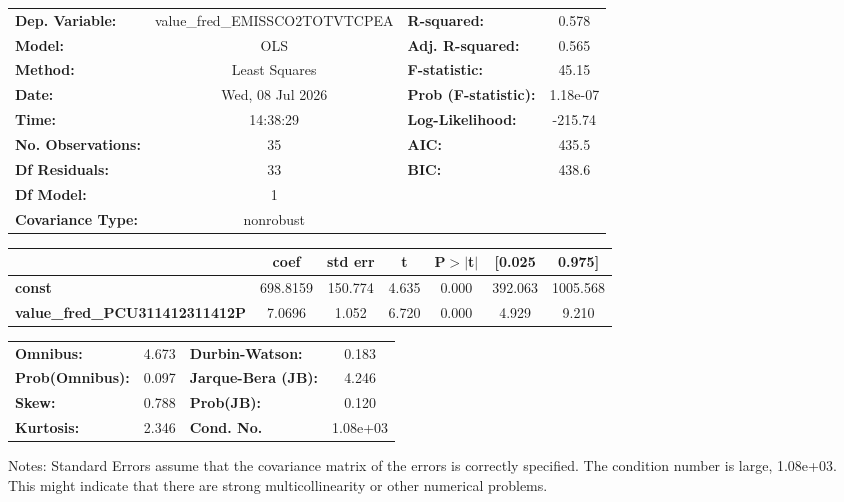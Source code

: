 \begin{center}
\begin{tabular}{lclc}
\toprule
\textbf{Dep. Variable:}                & value\_fred\_EMISSCO2TOTVTCPEA & \textbf{  R-squared:         } &     0.578   \\
\textbf{Model:}                        &              OLS               & \textbf{  Adj. R-squared:    } &     0.565   \\
\textbf{Method:}                       &         Least Squares          & \textbf{  F-statistic:       } &     45.15   \\
\textbf{Date:}                         &        Wed, 08 Jul 2026        & \textbf{  Prob (F-statistic):} &  1.18e-07   \\
\textbf{Time:}                         &            14:38:29            & \textbf{  Log-Likelihood:    } &   -215.74   \\
\textbf{No. Observations:}             &                 35             & \textbf{  AIC:               } &     435.5   \\
\textbf{Df Residuals:}                 &                 33             & \textbf{  BIC:               } &     438.6   \\
\textbf{Df Model:}                     &                  1             & \textbf{                     } &             \\
\textbf{Covariance Type:}              &           nonrobust            & \textbf{                     } &             \\
\bottomrule
\end{tabular}
\begin{tabular}{lcccccc}
                                       & \textbf{coef} & \textbf{std err} & \textbf{t} & \textbf{P$> |$t$|$} & \textbf{[0.025} & \textbf{0.975]}  \\
\midrule
\textbf{const}                         &     698.8159  &      150.774     &     4.635  &         0.000        &      392.063    &     1005.568     \\
\textbf{value\_fred\_PCU311412311412P} &       7.0696  &        1.052     &     6.720  &         0.000        &        4.929    &        9.210     \\
\bottomrule
\end{tabular}
\begin{tabular}{lclc}
\textbf{Omnibus:}       &  4.673 & \textbf{  Durbin-Watson:     } &    0.183  \\
\textbf{Prob(Omnibus):} &  0.097 & \textbf{  Jarque-Bera (JB):  } &    4.246  \\
\textbf{Skew:}          &  0.788 & \textbf{  Prob(JB):          } &    0.120  \\
\textbf{Kurtosis:}      &  2.346 & \textbf{  Cond. No.          } & 1.08e+03  \\
\bottomrule
\end{tabular}
\end{center}

Notes: \newline
 [1] Standard Errors assume that the covariance matrix of the errors is correctly specified. \newline
 [2] The condition number is large, 1.08e+03. This might indicate that there are \newline
 strong multicollinearity or other numerical problems.